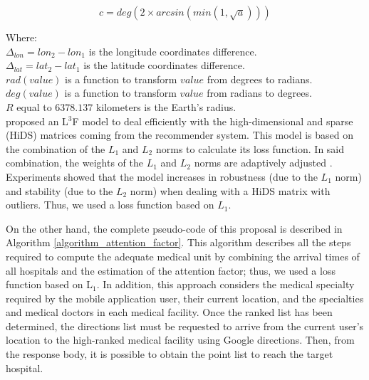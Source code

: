 \documentclass[sustainability,article,submit,pdftex,moreauthors]{Definitions/mdpi}
\begin{document}
\begin{equation}
\label{eq_c}
c = deg \left( 2 \times arcsin \left( min(1, \sqrt{a}) \right) \right)
\end{equation}

Where: \\
$\Delta_{lon}=lon_2 - lon_1$ is the longitude coordinates difference. \\ 
$\Delta_{lat}=lat_2 - lat_1$ is the latitude coordinates difference. \\
$rad(value)$ is a function to transform $value$ from degrees to radians. \\
$deg(value)$ is a function to transform $value$ from radians to degrees. \\
$R$ equal to $6378.137$ kilometers is the Earth's radius. \\

{\citet{wu2021l1} proposed an L$^3$F model to deal efficiently with the high-dimensional and sparse (HiDS) matrices coming from the recommender system. This model is based on the combination of the $L_1$ and $L_2$ norms to calculate its loss function. In said combination, the weights of the $L_1$ and $L_2$ norms are adaptively adjusted \cite{li2022diversified, wu2021latent}. Experiments showed that the model increases in robustness (due to the $L_1$ norm) and stability (due to the $L_2$ norm) when dealing with a HiDS matrix with outliers. Thus, we used a loss function based on $L_1$.}

{On the other hand, the complete pseudo-code of this proposal is described in Algorithm \ref{algorithm_attention_factor}. This algorithm describes all the steps required to compute the adequate medical unit by combining the arrival times of all hospitals and the estimation of the attention factor; thus, we used a loss function based on L$_1$. In addition, this approach considers the medical specialty required by the mobile application user, their current location, and the specialties and medical doctors in each medical facility. Once the ranked list has been determined, the directions list must be requested to arrive from the current user's location to the high-ranked medical facility using Google directions. Then, from the response body, it is possible to obtain the point list to reach the target hospital.}

\end{document}
